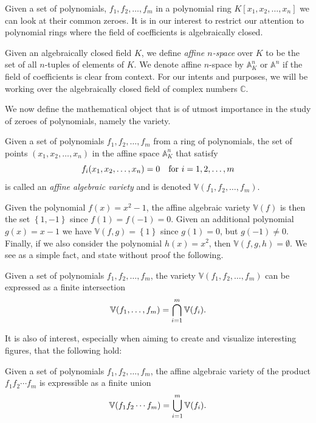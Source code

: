 \documentclass{article}
\newcommand{\C}{\ensuremath{\mathbb{C}}}
\newcommand{\A}{\ensuremath{\mathbb{A}}}
\newcommand{\V}{\ensuremath{\mathbb{V}}}
\begin{document}
    Given a set of polynomials, $f_1, f_2, \ldots, f_m$ in a polynomial ring
    $K[x_1, x_2, \ldots, x_n]$ we can look at their common zeroes. It is in our
    interest to restrict our attention to polynomial rings where the field of
    coefficients is algebraically closed.

    Given an algebraically closed field $K$, we define \emph{affine
    $n$-space} over $K$ to be the set of all $n$-tuples
    of elements of $K$. We denote affine $n$-space by $\A_K^n$ or $\A^n$ if the
    field of coefficients is clear from context.  For our intents and purposes,
    we will be working over the algebraically closed field of complex numbers
    $\C$. 
    
    We now define the mathematical object that is of utmost importance in the
    study of zeroes of polynomials, namely the variety.
    \begin{definition}
        Given a set of polynomials $f_1, f_2, \ldots, f_m$ from a ring of
        polynomials, the set of points $(x_1, x_2, \ldots, x_n)$ in the affine
        space $\A_K^n$ that satisfy
        \begin{equation}
            \notag
            f_i(x_1, x_2, \ldots, x_n) = 0 \quad \text{for } i = 1, 2, \ldots, m
        \end{equation}
        is called an \emph{affine algebraic variety} and is denoted $\V(f_1,
        f_2, \ldots, f_m)$.
    \end{definition}

    Given the polynomial $f(x) = x^2 - 1$, the affine algebraic variety $\V(f)$
    is then the set $\left\{ 1, -1 \right\}$ since $f(1) = f(-1) = 0$. Given an
    additional polynomial $g(x) = x-1$ we have $\V(f, g) = \left\{ 1 \right\}$
    since $g(1) = 0$, but $g(-1) \neq 0$. Finally, if we also consider the
    polynomial $h(x) = x^2$, then $\V(f, g, h) = \emptyset$. We see as a simple
    fact, and state without proof the following.
    
    \begin{corollary}
        \label{crl:set_one}
        Given a set of polynomials $f_1, f_2, \ldots, f_m$, the variety
        $\V(f_1, f_2, \ldots, f_m)$ can be expressed as a finite intersection
        \begin{equation}
            \notag
            \V(f_1, \ldots, f_m) = \bigcap_{i=1}^{m} \V(f_i).
        \end{equation}
    \end{corollary}
    It is also of interest, especially when aiming to create and visualize
    interesting figures, that the following hold:
    \begin{corollary}
        \label{crl:set_two}
        Given a set of polynomials $f_1, f_2, \ldots, f_m$, the affine algebraic
        variety of the product $f_1f_2\cdots f_m$ is expressible as a finite union
        \begin{equation}
            \notag
            \V(f_1f_2\cdots f_m) = \bigcup_{i=1}^{m} \V(f_i).
        \end{equation}
    \end{corollary}
    
\end{document}
